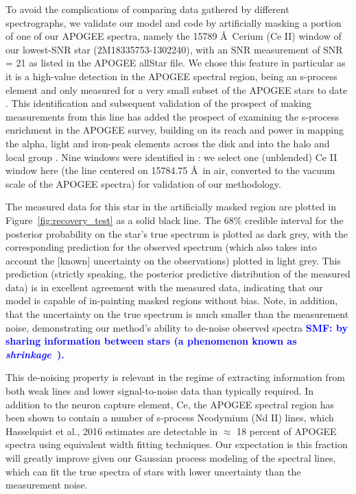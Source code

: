 \documentclass[a4paper,fleqn,usenatbib]{mnras}
\newcommand{\smf}[1]{\textbf{\textcolor{blue}{SMF: #1}}}
\begin{document}
To avoid the complications of comparing data gathered by different spectrographs, we validate our model and code by artificially masking a portion of one of our APOGEE spectra, namely the 15789 \AA\ Cerium (Ce II) window of our lowest-SNR star (2M18335753-1302240), with an SNR measurement of SNR = 21 as listed in the APOGEE allStar file. We chose this feature in particular as it is a high-value detection in the APOGEE spectral region, being an s-process element and only measured for a very small subset of the APOGEE stars to date \citep{Cunha2017}. This identification \citep{Cunha2017} and subsequent validation of the prospect of making measurements from this line has added the prospect of examining the s-process enrichment in the APOGEE survey, building on its reach and power in mapping the alpha, light and iron-peak elements across the disk and into the halo and local group \citep[e.g.,][]{Majewski2017, Nidever2014, Hayden2015, Weinberg2019}. Nine windows were identified in \citet{Cunha2017}: we select one (unblended) Ce II window here (the line centered on 15784.75 \AA\ in air, converted to the vacuum scale of the APOGEE spectra) for validation of our methodology. 


The measured data for this star in the artificially masked region are plotted in Figure~\ref{fig:recovery_test} as a solid black line. The 68\% credible interval for the posterior probability on the star's true spectrum is plotted as dark grey, with the corresponding prediction for the observed spectrum (which also takes into account the [known] uncertainty on the observations) plotted in light grey. This prediction (strictly speaking, the posterior predictive distribution of the measured data) is in excellent agreement with the measured data, indicating that our model is capable of in-painting masked regions without bias. Note, in addition, that the uncertainty on the true spectrum is much smaller than the measurement noise, demonstrating our method's ability to de-noise observed spectra \smf{by sharing information between stars (a phenomenon known as {\it shrinkage}~\citep[see, e.g.,][Chapter 13]{Busemeyer_etal:2015}).}

This de-noising property is relevant in the regime of extracting information from both weak lines and lower signal-to-noise data than typically required. In addition to the neuron capture element, Ce, the APOGEE spectral region has been shown to contain a number of s-process Neodymium (Nd II) lines, which Hasselquist et al., 2016 estimates are detectable in $\approx$ 18 percent of APOGEE spectra using equivalent width fitting techniques. Our expectation is this fraction will greatly improve given our Gaussian process modeling of the spectral lines, which
can fit the true spectra of stars with lower uncertainty than the measurement noise. 
\end{document}
